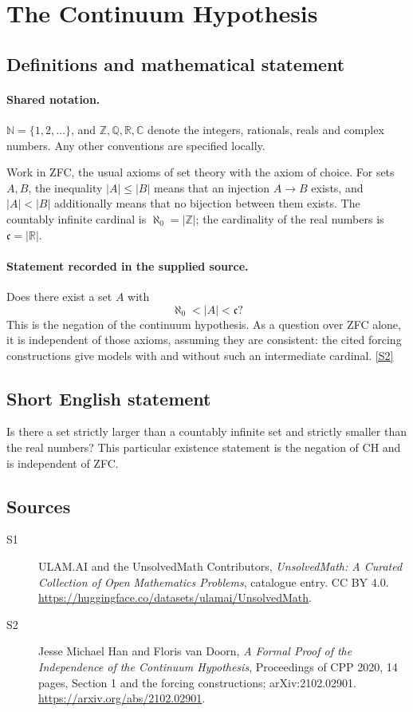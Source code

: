 \documentclass[11pt]{article}
\newcommand{\sref}[2]{\hyperlink{source:#1:#2}{[S#2]}}
\begin{document}
\section{The Continuum Hypothesis}\label{statement}

\subsection{Definitions and mathematical statement}

\paragraph{Shared notation.}$\mathbb N=\{1,2,\ldots\}$, and $\mathbb Z,\mathbb Q,\mathbb R,\mathbb C$ denote the integers, rationals, reals and complex numbers. Any other conventions are specified locally.


Work in ZFC, the usual axioms of set theory with the axiom of choice.
For sets \(A,B\), the inequality \(|A|\le|B|\) means that an injection
\(A\to B\) exists, and \(|A|<|B|\) additionally means that no bijection
between them exists.  The countably infinite cardinal is
\(\aleph_0=|\mathbb Z|\); the cardinality of the real numbers is
\(\mathfrak c=|\mathbb R|\).
\paragraph{Statement recorded in the supplied source.}
Does there exist a set \(A\) with
\[
 \aleph_0<|A|<\mathfrak c?
\]
This is the negation of the continuum hypothesis.  As a question over
ZFC alone, it is independent of those axioms, assuming they are
consistent: the cited forcing constructions give models with and
without such an intermediate cardinal. \sref{statement}{2}
\subsection{Short English statement}
Is there a set strictly larger than a countably infinite set and strictly smaller than the real numbers? This particular existence statement is the negation of CH and is independent of ZFC.
\subsection{Sources}
\begin{description}
\item[\hypertarget{source:statement:1}{S1}] ULAM.AI and the UnsolvedMath Contributors, \emph{UnsolvedMath: A Curated Collection of Open Mathematics Problems}, catalogue entry. CC BY 4.0. \url{https://huggingface.co/datasets/ulamai/UnsolvedMath}.
\item[\hypertarget{source:statement:2}{S2}] Jesse Michael Han and Floris van Doorn, \emph{A Formal Proof of the Independence of the Continuum Hypothesis}, Proceedings of CPP 2020, 14 pages, Section 1 and the forcing constructions; arXiv:2102.02901. \url{https://arxiv.org/abs/2102.02901}.
\end{description}
\label{end:statement}
\end{document}
